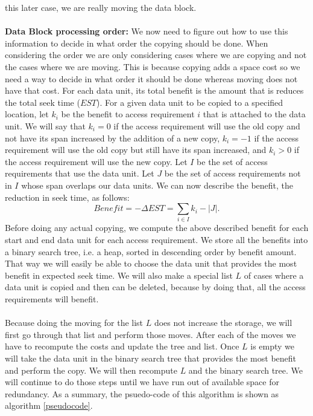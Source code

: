 this later case, we are really moving the data block. \\
\\
{\bf Data Block processing order:} 
We now need to figure out how to use this
information to decide in what order the copying should be done. When considering the order we are only considering cases where we are copying and not the cases where we are moving. This is because copying adds a space cost so we need a way to decide in what order it should be done whereas moving does not have that cost. For each data
unit, its total benefit is the amount that is reduces the total seek time
($EST$). For a given data unit to be copied to a specified location, let $k_i$
be the benefit to access requirement $i$ that is attached to the data unit. We
will say that $k_i=0$ if the access requirement will use the old copy and not have its span increased by the addition of a new copy, $k_i=-1$ if the access requirement will use the old copy but still have its span increased, and
$k_i>0$ if the access requirement will use the new copy. Let $I$ be the set of
access requirements that use the data unit. Let $J$ be the set of access
requirements not in $I$ whose span overlaps our data units. We can now describe
the benefit, the reduction in seek time, as follows:
\[
Benefit = -\Delta EST = \sum_{i \in I} k_i - |J|.
\]
Before doing any actual copying, we compute the above described benefit for
each start and end data unit for each access requirement. We store all the
benefits into a binary search tree, i.e. a heap, sorted in descending order by benefit
amount. That way we will easily be able to choose the data unit that provides
the most benefit in expected seek time. We will also make a special list $L$ of
cases where a data unit is copied and then can be deleted, because by doing
that, all the access
requirements will benefit. \\
\\
Because doing the moving for the list $L$ does not increase the storage, we will first go through that list and perform those moves. After each of the moves we have to recompute the costs and update the tree and list. Once $L$ is empty we will take the data unit in the binary search tree that provides the most benefit and perform the copy. We will then recompute $L$ and the binary search tree. We will continue to do those steps until we have run out of available space for redundancy. As a summary, the psuedo-code of this algorithm is shown as algorithm \ref{pseudocode}.

